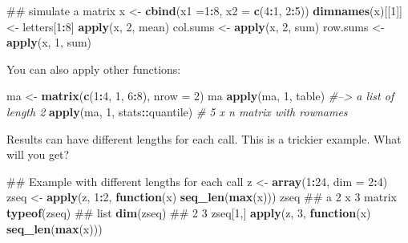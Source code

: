 \documentclass[12pt,]{krantz}
\makeatletter
\newenvironment{Shaded}{\begin{snugshade}}{\end{snugshade}}
\newcommand{\KeywordTok}[1]{\textcolor[rgb]{0.27,0.27,0.27}{\textbf{#1}}}
\newcommand{\DataTypeTok}[1]{\textcolor[rgb]{0.27,0.27,0.27}{#1}}
\newcommand{\DecValTok}[1]{\textcolor[rgb]{0.06,0.06,0.06}{#1}}
\newcommand{\StringTok}[1]{\textcolor[rgb]{0.5,0.5,0.5}{#1}}
\newcommand{\CommentTok}[1]{\textcolor[rgb]{0.37,0.37,0.37}{\textit{#1}}}
\newcommand{\ControlFlowTok}[1]{\textcolor[rgb]{0.27,0.27,0.27}{\textbf{#1}}}
\newcommand{\OperatorTok}[1]{\textcolor[rgb]{0.43,0.43,0.43}{\textbf{#1}}}
\newcommand{\NormalTok}[1]{#1}
\newenvironment{kframe}{%
\medskip{}
\setlength{\fboxsep}{.8em}
 \def\at@end@of@kframe{}%
 \ifinner\ifhmode%
  \def\at@end@of@kframe{\end{minipage}}%
  \begin{minipage}{\columnwidth}%
 \fi\fi%
 \def\FrameCommand##1{\hskip\@totalleftmargin \hskip-\fboxsep
 \colorbox{shadecolor}{##1}\hskip-\fboxsep
     \hskip-\linewidth \hskip-\@totalleftmargin \hskip\columnwidth}%
 \MakeFramed {\advance\hsize-\width
   \@totalleftmargin\z@ \linewidth\hsize
   \@setminipage}}%
 {\par\unskip\endMakeFramed%
 \at@end@of@kframe}
\renewenvironment{Shaded}{\begin{kframe}}{\end{kframe}}
\theoremstyle{definition}
\theoremstyle{definition}
\theoremstyle{definition}
\theoremstyle{remark}
\makeatother
\begin{document}
\begin{Shaded}
\begin{Highlighting}[]
\NormalTok{## simulate a matrix}
\NormalTok{x <-}\StringTok{ }\KeywordTok{cbind}\NormalTok{(}\DataTypeTok{x1 =}\DecValTok{1}\OperatorTok{:}\DecValTok{8}\NormalTok{, }\DataTypeTok{x2 =} \KeywordTok{c}\NormalTok{(}\DecValTok{4}\OperatorTok{:}\DecValTok{1}\NormalTok{, }\DecValTok{2}\OperatorTok{:}\DecValTok{5}\NormalTok{))}
\KeywordTok{dimnames}\NormalTok{(x)[[}\DecValTok{1}\NormalTok{]] <-}\StringTok{ }\NormalTok{letters[}\DecValTok{1}\OperatorTok{:}\DecValTok{8}\NormalTok{]}
\KeywordTok{apply}\NormalTok{(x, }\DecValTok{2}\NormalTok{, mean)}
\NormalTok{col.sums <-}\StringTok{ }\KeywordTok{apply}\NormalTok{(x, }\DecValTok{2}\NormalTok{, sum)}
\NormalTok{row.sums <-}\StringTok{ }\KeywordTok{apply}\NormalTok{(x, }\DecValTok{1}\NormalTok{, sum)}
\end{Highlighting}
\end{Shaded}

You can also apply other functions:

\begin{Shaded}
\begin{Highlighting}[]
\NormalTok{ma <-}\StringTok{ }\KeywordTok{matrix}\NormalTok{(}\KeywordTok{c}\NormalTok{(}\DecValTok{1}\OperatorTok{:}\DecValTok{4}\NormalTok{, }\DecValTok{1}\NormalTok{, }\DecValTok{6}\OperatorTok{:}\DecValTok{8}\NormalTok{), }\DataTypeTok{nrow =} \DecValTok{2}\NormalTok{)}
\NormalTok{ma}
\KeywordTok{apply}\NormalTok{(ma, }\DecValTok{1}\NormalTok{, table)  }\CommentTok{#--> a list of length 2}
\KeywordTok{apply}\NormalTok{(ma, }\DecValTok{1}\NormalTok{, stats}\OperatorTok{::}\NormalTok{quantile) }\CommentTok{# 5 x n matrix with rownames}
\end{Highlighting}
\end{Shaded}

Results can have different lengths for each call. This is a trickier
example. What will you get?

\begin{Shaded}
\begin{Highlighting}[]
\NormalTok{## Example with different lengths for each call}
\NormalTok{z <-}\StringTok{ }\KeywordTok{array}\NormalTok{(}\DecValTok{1}\OperatorTok{:}\DecValTok{24}\NormalTok{, }\DataTypeTok{dim =} \DecValTok{2}\OperatorTok{:}\DecValTok{4}\NormalTok{)}
\NormalTok{zseq <-}\StringTok{ }\KeywordTok{apply}\NormalTok{(z, }\DecValTok{1}\OperatorTok{:}\DecValTok{2}\NormalTok{, }\ControlFlowTok{function}\NormalTok{(x) }\KeywordTok{seq_len}\NormalTok{(}\KeywordTok{max}\NormalTok{(x)))}
\NormalTok{zseq         ## a 2 x 3 matrix}
\KeywordTok{typeof}\NormalTok{(zseq) ## list}
\KeywordTok{dim}\NormalTok{(zseq) ## 2 3}
\NormalTok{zseq[}\DecValTok{1}\NormalTok{,]}
\KeywordTok{apply}\NormalTok{(z, }\DecValTok{3}\NormalTok{, }\ControlFlowTok{function}\NormalTok{(x) }\KeywordTok{seq_len}\NormalTok{(}\KeywordTok{max}\NormalTok{(x)))}
\end{Highlighting}
\end{Shaded}
\end{document}
